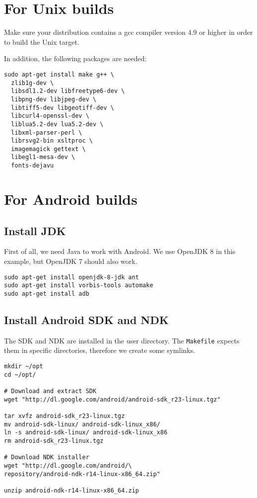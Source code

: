 \section{For Unix builds}

Make sure your distribution contains a gcc compiler version 4.9 or higher in order to build the Unix target.

In addition, the following packages are needed:

\begin{verbatim}
sudo apt-get install make g++ \
  zlib1g-dev \
  libsdl1.2-dev libfreetype6-dev \
  libpng-dev libjpeg-dev \
  libtiff5-dev libgeotiff-dev \
  libcurl4-openssl-dev \
  liblua5.2-dev lua5.2-dev \
  libxml-parser-perl \
  librsvg2-bin xsltproc \
  imagemagick gettext \
  libegl1-mesa-dev \
  fonts-dejavu
\end{verbatim}

\section{For Android  builds}
\subsection{Install JDK}
First of all, we need Java to work with Android. We use OpenJDK 8 in this example, but OpenJDK 7 should also work.

\begin{verbatim}
sudo apt-get install openjdk-8-jdk ant
sudo apt-get install vorbis-tools automake
sudo apt-get install adb
\end{verbatim}

\subsection{Install Android SDK and NDK}

The SDK and NDK are installed in the user directory. The \texttt{Makefile} expects them in specific directories, therefore we create some symlinks.

\begin{verbatim}
mkdir ~/opt
cd ~/opt/

# Download and extract SDK
wget "http://dl.google.com/android/android-sdk_r23-linux.tgz"

tar xvfz android-sdk_r23-linux.tgz
mv android-sdk-linux/ android-sdk-linux_x86/
ln -s android-sdk-linux/ android-sdk-linux_x86
rm android-sdk_r23-linux.tgz

# Download NDK installer
wget "http://dl.google.com/android/\
repository/android-ndk-r14-linux-x86_64.zip"

unzip android-ndk-r14-linux-x86_64.zip
\end{verbatim}


